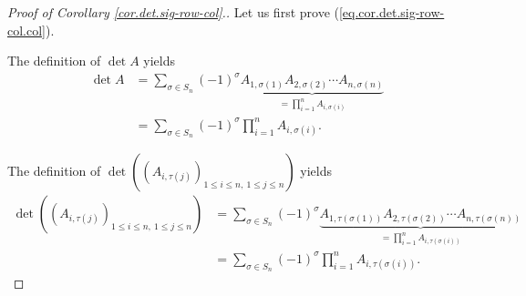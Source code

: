 \begin{proof}
[Proof of Corollary \ref{cor.det.sig-row-col}.]Let us first prove
(\ref{eq.cor.det.sig-row-col.col}).

The definition of $\det A$ yields%
\begin{align}
\det A  &  =\sum_{\sigma\in S_{n}}\left(  -1\right)  ^{\sigma}%
\underbrace{A_{1,\sigma\left(  1\right)  }A_{2,\sigma\left(  2\right)  }\cdots
A_{n,\sigma\left(  n\right)  }}_{=\prod_{i=1}^{n}A_{i,\sigma\left(  i\right)
}}\nonumber\\
&  =\sum_{\sigma\in S_{n}}\left(  -1\right)  ^{\sigma}\prod_{i=1}%
^{n}A_{i,\sigma\left(  i\right)  }. \label{pf.cor.det.sig-row-col.0}%
\end{align}


The definition of $\det\left(  \left(  A_{i,\tau\left(  j\right)  }\right)
_{1\leq i\leq n,\ 1\leq j\leq n}\right)  $ yields%
\begin{align}
\det\left(  \left(  A_{i,\tau\left(  j\right)  }\right)  _{1\leq i\leq
n,\ 1\leq j\leq n}\right)   &  =\sum_{\sigma\in S_{n}}\left(  -1\right)
^{\sigma}\underbrace{A_{1,\tau\left(  \sigma\left(  1\right)  \right)
}A_{2,\tau\left(  \sigma\left(  2\right)  \right)  }\cdots A_{n,\tau\left(
\sigma\left(  n\right)  \right)  }}_{=\prod_{i=1}^{n}A_{i,\tau\left(
\sigma\left(  i\right)  \right)  }}\nonumber\\
&  =\sum_{\sigma\in S_{n}}\left(  -1\right)  ^{\sigma}\prod_{i=1}^{n}%
A_{i,\tau\left(  \sigma\left(  i\right)  \right)  }.
\label{pf.cor.det.sig-row-col.1}%
\end{align}



\end{proof}
